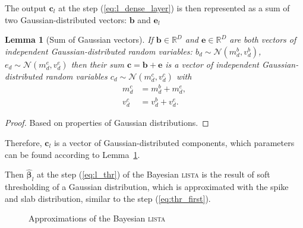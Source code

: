 \documentclass[letterpaper]{article}
\newtheorem{lemma}{Lemma}
\begin{document}
The output $\mathbf{c}_l$ at the step (\ref{eq:l_dense_layer}) is then represented as a sum of two Gaussian-distributed vectors: $\mathbf{b}$ and $\mathbf{e}_l$


\begin{lemma}[Sum of Gaussian vectors]
\label{thm:sum_vectors}
If $\mathbf{b} \in \mathbb{R}^{D}$ and $\mathbf{e} \in \mathbb{R}^{D}$ are both vectors of independent Gaussian-distributed random variables: $b_{d} \sim \mathcal{N}(m^b_{d}, v^b_{d})$, $e_{d} \sim \mathcal{N}(m^e_{d}, v^e_{d})$ then their sum $\mathbf{c} = \mathbf{b} + \mathbf{e}$ is a vector of independent Gaussian-distributed random variables $c_{d} \sim \mathcal{N}(m^c_{d}, v^c_{d})$ with
\begin{subequations}
\begin{align}
m^c_{d} &= m^b_{d} + m^e_{d}, \\
v^c_{d} &= v^b_{d} + v^e_{d}.
 \end{align}
\end{subequations}
\end{lemma}
\begin{proof}
Based on properties of Gaussian distributions.
\end{proof}

Therefore, $\mathbf{c}_l$ is a vector of Gaussian-distributed components, which parameters can be found according to Lemma~\ref{thm:sum_vectors}.

Then $\widehat{\boldsymbol\beta}_{l}$ at the step (\ref{eq:l_thr}) of the Bayesian \textsc{lista} is the result of soft thresholding of a Gaussian distribution, which is approximated with the spike and slab distribution,  similar to the step (\ref{eq:thr_first}).

\begin{figure}[!t]
\caption{Approximations of the Bayesian \textsc{lista}}
\end{figure}
\end{document}
